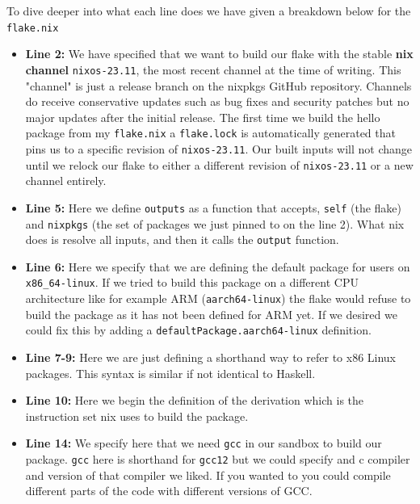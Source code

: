 To dive deeper into what each line does we have given a breakdown below for the \texttt{flake.nix} \\
{ \small
\begin{itemize}
  \item \textbf{Line 2:} We have specified that we want to build our flake with the stable \textbf{nix channel} \texttt{nixos-23.11}, the most recent channel at the time of writing. This "channel" is just a release branch on the nixpkgs GitHub repository. Channels do receive conservative updates such as bug fixes and security patches but no major updates after the initial release. The first time we build the hello package from my \texttt{flake.nix} a \texttt{flake.lock} is automatically generated that pins us to a specific revision of \texttt{nixos-23.11}. Our built inputs will not change until we relock our flake to either a different revision of \texttt{nixos-23.11} or a new channel entirely. 

  \item \textbf{Line 5:} Here we define \texttt{outputs} as a function that accepts, \texttt{self} (the flake) and \texttt{nixpkgs} (the set of packages we just pinned to on the line 2). What nix does is resolve all inputs, and then it calls the \texttt{output} function.
  
  \item \textbf{Line 6:} Here we specify that we are defining the default package for users on \texttt{x86\_64-linux}. If we tried to build this package on a different CPU architecture like for example ARM (\texttt{aarch64-linux}) the flake would refuse to build the package as it has not been defined for ARM yet. If we desired we could fix this by adding a \texttt{defaultPackage.aarch64-linux} definition.

  \item \textbf{Line 7-9:} Here we are just defining a shorthand way to refer to x86 Linux packages. This syntax is similar if not identical to Haskell.

  \item \textbf{Line 10:} Here we begin the definition of the derivation which is the instruction set nix uses to build the package.
  
  \item \textbf{Line 14:} We specify here that we need \texttt{gcc} in our sandbox to build our package. \texttt{gcc} here is shorthand for \texttt{gcc12} but we could specify and c compiler and version of that compiler we liked. If you wanted to you could compile different parts of the code with different versions of GCC.


\end{itemize}}
